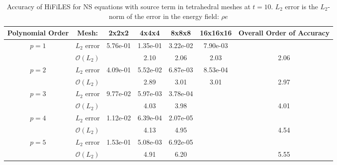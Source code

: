 \begin{table}[H]
\centering
\begin{tabular}{ c c c c c c c} 
  
 Polynomial Order & Mesh: & 2x2x2 & 4x4x4 & 8x8x8 & 16x16x16 & Overall Order of Accuracy \\ 
 \hline 
 \multirow{2}{*}{$p = 1$} & $L_2$ error & 5.76e-01 & 1.35e-01 & 3.22e-02 & 7.90e-03 &   \\ 
  
   & $\mathcal{O}(L_2)$ &   & 2.10 & 2.06 & 2.03 & 2.06 \\ 
 \hline 
 \multirow{2}{*}{$p = 2$} & $L_2$ error & 4.09e-01 & 5.52e-02 & 6.87e-03 & 8.53e-04 &   \\ 
  
   & $\mathcal{O}(L_2)$ &   & 2.89 & 3.01 & 3.01 & 2.97 \\ 
 \hline 
 \multirow{2}{*}{$p = 3$} & $L_2$ error & 9.77e-02 & 5.97e-03 & 3.78e-04 &   &   \\ 
  
   & $\mathcal{O}(L_2)$ &   & 4.03 & 3.98 &   & 4.01 \\ 
 \hline 
 \multirow{2}{*}{$p = 4$} & $L_2$ error & 1.12e-02 & 6.39e-04 & 2.07e-05 &   &   \\ 
  
   & $\mathcal{O}(L_2)$ &   & 4.13 & 4.95 &   & 4.54 \\ 
 \hline 
 \multirow{2}{*}{$p = 5$} & $L_2$ error & 1.53e-01 & 5.08e-03 & 6.92e-05 &   &   \\ 
  
   & $\mathcal{O}(L_2)$ &   & 4.91 & 6.20 &   & 5.55 \\ 
 \hline 
 \end{tabular}
\caption{Accuracy of HiFiLES for NS equations with source term in tetrahedral meshes at $t = 10$. $L_2$ error is the $L_2$-norm of the error in the energy field: $\rho e$}
\label{table:tetsError1} 
 \end{table}
